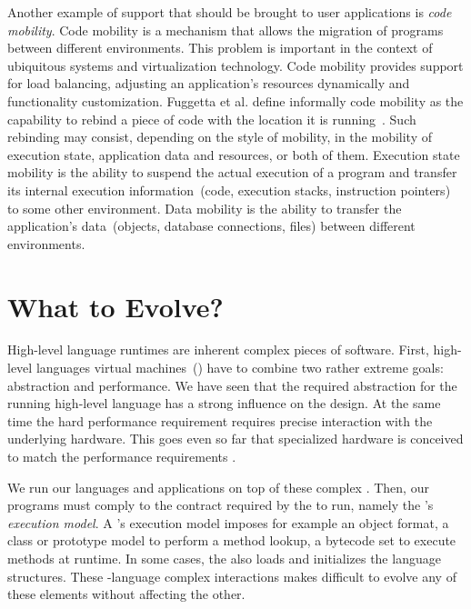 Another example of support that should be brought to user applications is \emph{code mobility}. Code mobility is a mechanism that allows the migration of programs between different environments. This problem is important in the context of ubiquitous systems and virtualization technology. Code mobility provides support for \eg load balancing, adjusting an application's resources dynamically and functionality customization. Fuggetta et al. define informally code mobility as the capability to rebind a piece of code with the location it is running~\cite{Fugg98a}. Such rebinding may consist, depending on the style of mobility, in the mobility of execution state, application data and resources, or both of them. Execution state mobility is the ability to suspend the actual execution of a program and transfer its internal execution information~(\eg code, execution stacks, instruction pointers) to some other environment. Data mobility is the ability to transfer the application's data~(\eg objects, database connections, files) between different environments.


\section{What to Evolve?}

High-level language runtimes are inherent complex pieces of software.
First, high-level languages virtual machines~(\VMs) have to combine two rather extreme goals: abstraction and performance.
We have seen that the required abstraction for the running high-level language has a strong influence on the \VM design.
At the same time the hard performance requirement requires precise interaction with the underlying hardware.
This goes even so far that specialized hardware is conceived to match the performance requirements \cite{Unga84a,Stef84a,McGh98a,Clic05a}.


We run our languages and applications on top of these complex \VMs.
Then, our programs must comply to the contract required by the \VM to run, namely the \VM's \emph{execution model}.
A \VM's execution model imposes for example an object format, a class or prototype model to perform a method lookup, a bytecode set to execute methods at runtime.
In some cases, the \VM also loads and initializes the language structures.
These \VM-language complex interactions makes difficult to evolve any of these elements without affecting the other.

